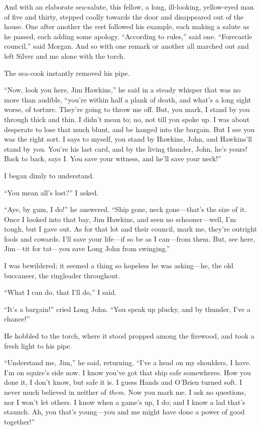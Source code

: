 And with an elaborate sea-salute, this fellow, a long, ill-looking, yellow-eyed man of five and thirty, stepped coolly towards the door and disappeared out of the house. One after another the rest followed his example, each making a salute as he passed, each adding some apology. \enquote{According to rules,} said one. \enquote{Forecastle council,} said Morgan. And so with one remark or another all marched out and left Silver and me alone with the torch.

The sea-cook instantly removed his pipe.

\enquote{Now, look you here, Jim Hawkins,} he said in a steady whisper that was no more than audible, \enquote{you’re within half a plank of death, and what’s a long sight worse, of torture. They’re going to throw me off. But, you mark, I stand by you through thick and thin. I didn’t mean to; no, not till you spoke up. I was about desperate to lose that much blunt, and be hanged into the bargain. But I see you was the right sort. I says to myself, you stand by Hawkins, John, and Hawkins’ll stand by you. You’re his last card, and by the living thunder, John, he’s yours! Back to back, says I. You save your witness, and he’ll save your neck!}

I began dimly to understand.

\enquote{You mean all’s lost?} I asked.

\enquote{Aye, by gum, I do!} he answered. \enquote{Ship gone, neck gone---that’s the size of it. Once I looked into that bay, Jim Hawkins, and seen no schooner---well, I’m tough, but I gave out. As for that lot and their council, mark me, they’re outright fools and cowards. I’ll save your life---if so be as I can---from them. But, see here, Jim---tit for tat---you save Long John from swinging.}

I was bewildered; it seemed a thing so hopeless he was asking---he, the old buccaneer, the ringleader throughout.

\enquote{What I can do, that I’ll do,} I said.

\enquote{It’s a bargain!} cried Long John. \enquote{You speak up plucky, and by thunder, I’ve a chance!}

He hobbled to the torch, where it stood propped among the firewood, and took a fresh light to his pipe.

\enquote{Understand me, Jim,} he said, returning. \enquote{I’ve a head on my shoulders, I have. I’m on squire’s side now. I know you’ve got that ship safe somewheres. How you done it, I don’t know, but safe it is. I guess Hands and O’Brien turned soft. I never much believed in neither of \textit{them.} Now you mark me. I ask no questions, nor I won’t let others. I know when a game’s up, I do; and I know a lad that’s staunch. Ah, you that’s young---you and me might have done a power of good together!}


